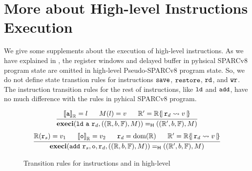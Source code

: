 \section{More about High-level Instructions Execution}
\label{appendix:more-about-high-level-insExec}

We give some supplements about the execution of high-level instructions. 
As we have explained in \Sec{\ref{subsec:High-level Pseudo-SPARCv8 Language}}, 
the register windows and delayed buffer in pyhsical SPARCv8 program state 
are omitted in high-level Pseudo-SPARCv8 program state. So, we do not define  
state transtion rules for instructions $\texttt{save}{}$, $\texttt{restore}{}$, $\texttt{rd}{}$, 
and $\texttt{wr}{}$. The instruction transition rules for the rest of instructions, like  
$\texttt{ld}{}$ and $\texttt{add}{}$, have no much difference with the rules in pyhical SPARCv8 program. 
\begin{figure}[!h]
    \centering
    \[
        \begin{array}{c}
            \infer
            {
                \hexeci{(\ld \ \aexp \ \reg{d}, ((\hRfile, \block, \hWstk), \Mem))}
                    {((\hRfile', \block, \hWstk), \Mem)}
            }
            {
                \evalR{\aexp}{\hRfile} = \loc \quad \ \ 
                \Mem(\loc) = \val \quad \ \ 
                \hRfile' = \hRfile\hRegUpd{ \reg{d} \rightsquigarrow \val } 
            } \\
            \\[-5pt]
            \infer
            {
                \hexeci{(\cadd \ \reg{s}, \oexp, \reg{d}, ((\hRfile, \block, \hWstk), \Mem))}
                    {((\hRfile', \block, \hWstk), \Mem)}
            }
            {
                \hRfile(\reg{s}) = \val_1 \quad \ \ 
                \evalR{\oexp}{\hRfile} = \val_2 \quad \ \ 
                \reg{d} = \dom(\hRfile) \quad \ \ 
                \hRfile' = \hRfile\hRegUpd{ \reg{d} \rightsquigarrow \val }
            }
        \end{array}
    \]
    \caption{Transition rules for instructions \ld{} and \cadd{} in high-level}
    \label{fig:Transition rules for instructions ld and add in high-level}
\end{figure}

